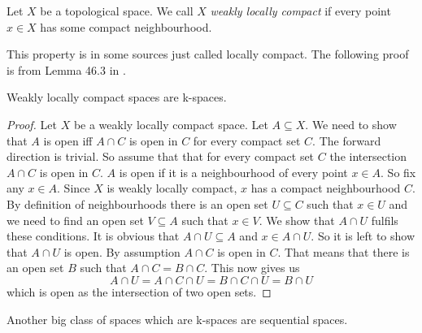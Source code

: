 \begin{defi}
    Let $X$ be a topological space.
    We call $X$ \emph{weakly locally compact} if every point $x \in X$ has some compact neighbourhood.
    \href{https://github.com/leanprover-community/mathlib4/blob/93828f4cd10fb8cab31700b110fd2751d36bf1b8/Mathlib/Topology/Defs/Filter.lean#L270-L274}{\faExternalLink}
\end{defi}

This property is in some sources just called locally compact.
The following proof is from Lemma 46.3 in \cite{Munkres2014}.

\begin{lem} \label{lem:weaklylocallycompactiskspace}
    Weakly locally compact spaces are k-spaces.
    \href{https://github.com/scholzhannah/CWComplexes/blob/7be4872a05b534011cc969eb5b80a4b7f0bf57e2/CWcomplexes/KSpace.lean#L69-L86}{\faExternalLink}
\end{lem}
\begin{proof}
    Let $X$ be a weakly locally compact space. 
    Let $A \subseteq X$.
    We need to show that $A$ is open iff $A \cap C$ is open in $C$ for every compact set $C$.
    The forward direction is trivial. 
    So assume that that for every compact set $C$ the intersection $A \cap C$ is open in $C$.
    $A$ is open if it is a neighbourhood of every point $x \in A$.
    So fix any $x \in A$.
    Since $X$ is weakly locally compact, $x$ has a compact neighbourhood $C$.
    By definition of neighbourhoods there is an open set $U \subseteq C$ such that $x \in U$ and we need to find an open set $V \subseteq A$ such that $x \in V$.
    We show that $A \cap U$ fulfils these conditions. 
    It is obvious that $A \cap U \subseteq A$ and $x \in A \cap U$. 
    So it is left to show that $A \cap U$ is open.
    By assumption $A \cap C$ is open in $C$. 
    That means that there is an open set $B$ such that $A \cap C = B \cap C$. 
    This now gives us 
    \[A \cap U = A \cap C \cap U = B \cap C \cap U = B \cap U\]
    which is open as the intersection of two open sets. 
\end{proof}

Another big class of spaces which are k-spaces are sequential spaces. 

